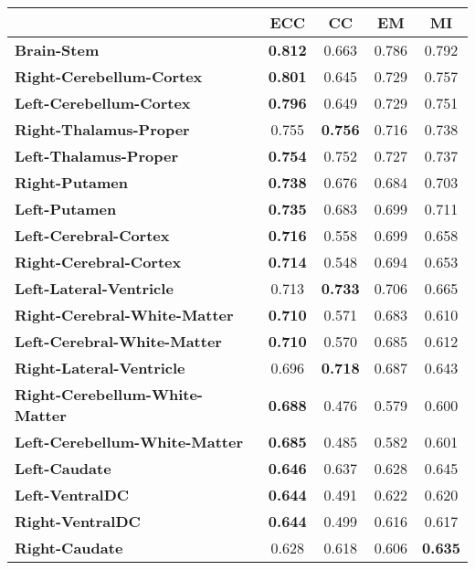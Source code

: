 \begin{table*}[h!]
  \centering
  {\small
    \begin{tabular}{lcccc}
    \toprule
          & \textbf{ECC} & \textbf{CC} & \textbf{EM} & \textbf{MI} \\
    \midrule
    \textbf{Brain-Stem} & \textbf{0.812} & 0.663 & 0.786 & 0.792 \\
    \textbf{Right-Cerebellum-Cortex} & \textbf{0.801} & 0.645 & 0.729 & 0.757 \\
    \textbf{Left-Cerebellum-Cortex} & \textbf{0.796} & 0.649 & 0.729 & 0.751 \\
    \textbf{Right-Thalamus-Proper} & 0.755 & \textbf{0.756} & 0.716 & 0.738 \\
    \textbf{Left-Thalamus-Proper} & \textbf{0.754} & 0.752 & 0.727 & 0.737 \\
    \textbf{Right-Putamen} & \textbf{0.738} & 0.676 & 0.684 & 0.703 \\
    \textbf{Left-Putamen} & \textbf{0.735} & 0.683 & 0.699 & 0.711 \\
    \textbf{Left-Cerebral-Cortex} & \textbf{0.716} & 0.558 & 0.699 & 0.658 \\
    \textbf{Right-Cerebral-Cortex} & \textbf{0.714} & 0.548 & 0.694 & 0.653 \\
    \textbf{Left-Lateral-Ventricle} & 0.713 & \textbf{0.733} & 0.706 & 0.665 \\
    \textbf{Right-Cerebral-White-Matter} & \textbf{0.710} & 0.571 & 0.683 & 0.610 \\
    \textbf{Left-Cerebral-White-Matter} & \textbf{0.710} & 0.570 & 0.685 & 0.612 \\
    \textbf{Right-Lateral-Ventricle} & 0.696 & \textbf{0.718} & 0.687 & 0.643 \\
    \textbf{Right-Cerebellum-White-Matter} & \textbf{0.688} & 0.476 & 0.579 & 0.600 \\
    \textbf{Left-Cerebellum-White-Matter} & \textbf{0.685} & 0.485 & 0.582 & 0.601 \\
    \textbf{Left-Caudate} & \textbf{0.646} & 0.637 & 0.628 & 0.645 \\
    \textbf{Left-VentralDC} & \textbf{0.644} & 0.491 & 0.622 & 0.620 \\
    \textbf{Right-VentralDC} & \textbf{0.644} & 0.499 & 0.616 & 0.617 \\
    \textbf{Right-Caudate} & 0.628 & 0.618 & 0.606 & \textbf{0.635} \\

\end{tabular}}
\end{table*}
